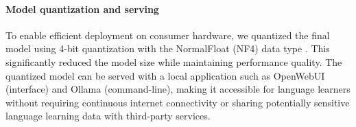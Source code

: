 \paragraph{Model quantization and serving} To enable efficient deployment on consumer hardware, we quantized the final model using 4-bit quantization with the NormalFloat (NF4) data type \citep{dettmersQLoRAEfficientFinetuning2023}. This significantly reduced the model size while maintaining performance quality. The quantized model can be served with a local application such as OpenWebUI (interface) and Ollama (command-line), making it accessible for language learners without requiring continuous internet connectivity or sharing potentially sensitive language learning data with third-party services.
